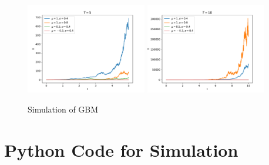 \documentclass{homework}
\begin{document}
    \begin{figure}
        \centering
        \includegraphics[width=0.47\textwidth]{T=5}
        \includegraphics[width=0.47\textwidth]{T=10}
        \caption{Simulation of GBM}
        \label{fig:simulation}
    \end{figure}

    \appendix
    \section{Python Code for Simulation}
    \begin{fullwidth}
    
    \end{fullwidth}
\end{document}
